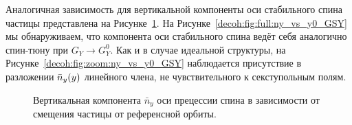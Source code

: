 Аналогичная зависимость для вертикальной компоненты оси стабильного спина частицы представлена на Рисунке~\ref{decoh:fig:ny_vs_y0_GSY}. На Рисунке~\ref{decoh:fig:full:ny_vs_y0_GSY} мы обнаруживаем, что компонента оси стабильного спина ведёт себя аналогично спин-тюну при $G_Y \rightarrow G_Y^0$. Как и в случае идеальной структуры, на Рисунке~\ref{decoh:fig:zoom:ny_vs_y0_GSY} наблюдается присутствие в разложении $\bar n_y(y)$ линейного члена, не чувствительного к секступольным полям.

\begin{figure}[h!]
	\centering
	\caption{Вертикальная компонента $\bar n_y$ оси прецессии спина в зависимости от смещения частицы от референсной орбиты.\label{decoh:fig:ny_vs_y0_GSY}}
\end{figure}

